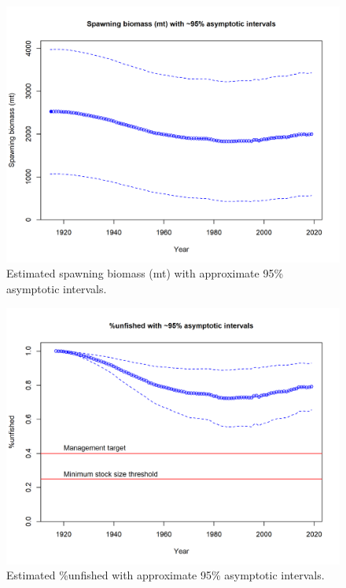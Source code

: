 \documentclass[12pt,]{article}
\begin{document}
\begin{figure}[!h]
\begin{centering}
\includegraphics{r4ss/plots_mod1/ts7_Spawning_biomass_(mt)_with_95_asymptotic_intervals_intervals.png}
\caption{Estimated spawning biomass (mt) with approximate 95\% asymptotic intervals.}\label{fig:ts7_Spawning_biomass_(mt)_with_95_asymptotic_intervals_intervals}
\end{centering}
\end{figure}

\FloatBarrier

\begin{figure}
\centering
\includegraphics{r4ss/plots_mod1/ts9_unfished_with_95_asymptotic_intervals_intervals.png}
\caption{Estimated \%unfished with approximate 95\% asymptotic
intervals.
\label{fig:ts9_unfished_with_95_asymptotic_intervals_intervals}}
\end{figure}
\end{document}
